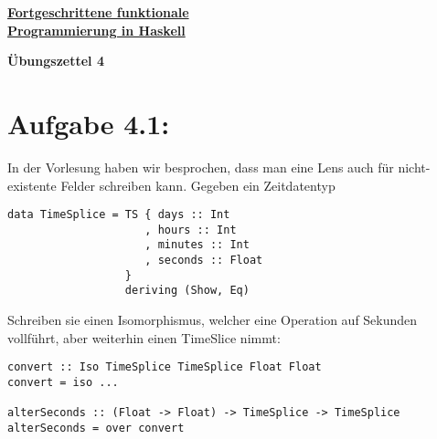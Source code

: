 \documentclass[a4paper,10pt]{scrartcl}
\newcommand{\underfat}[1]{\underline{\textbf{#1}}}
\newcommand{\theuebungszettel}{4}
\begin{document}
\begin{center}
  \begin{huge}
    \underfat{Fortgeschrittene funktionale}\\
    \underfat{Programmierung in Haskell}\\
  \end{huge}
\begin{LARGE}
\textbf{Übungszettel \theuebungszettel}
\end{LARGE}
\end{center}
\section*{Aufgabe \theuebungszettel.1:}
In der Vorlesung haben wir besprochen, dass man eine Lens auch für nicht-existente Felder schreiben kann. Gegeben ein Zeitdatentyp
\begin{verbatim}
data TimeSplice = TS { days :: Int
                     , hours :: Int
                     , minutes :: Int
                     , seconds :: Float
                  }
                  deriving (Show, Eq)
\end{verbatim}
Schreiben sie einen Isomorphismus, welcher eine Operation auf Sekunden vollführt, aber weiterhin einen TimeSlice nimmt:
\begin{verbatim}
convert :: Iso TimeSplice TimeSplice Float Float
convert = iso ...

alterSeconds :: (Float -> Float) -> TimeSplice -> TimeSplice
alterSeconds = over convert
\end{verbatim}
\end{document}

